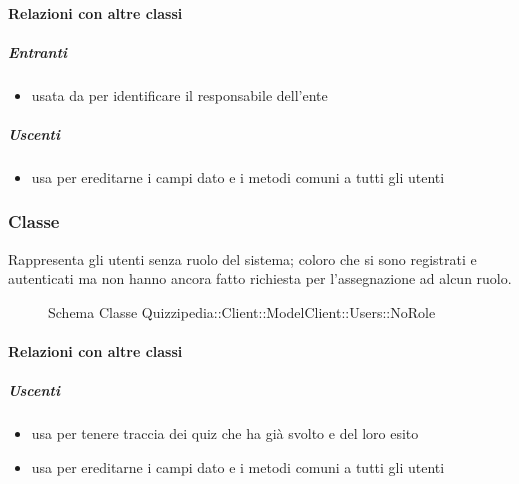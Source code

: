 \paragraph{Relazioni con altre classi}
\subparagraph{Entranti}
\begin{itemize}
\item usata da  per identificare il responsabile dell'ente
\end{itemize}
\subparagraph{Uscenti}
\begin{itemize}
\item usa  per ereditarne i campi dato e i metodi comuni a tutti gli utenti
\end{itemize}
\subsubsection{Classe }
Rappresenta gli utenti senza ruolo del sistema; coloro che si sono registrati e autenticati ma non hanno ancora fatto richiesta per l'assegnazione ad alcun ruolo.
\begin{figure}[H]
\centering
\noindent{}
\caption[Schema Classe NoRole]{Schema Classe Quizzipedia::Client::ModelClient::Users::NoRole}
\end{figure}
\paragraph{Relazioni con altre classi}
\subparagraph{Uscenti}
\begin{itemize}
\item usa  per tenere traccia dei quiz che ha già svolto e del loro esito
\item usa  per ereditarne i campi dato e i metodi comuni a tutti gli utenti
\end{itemize}
